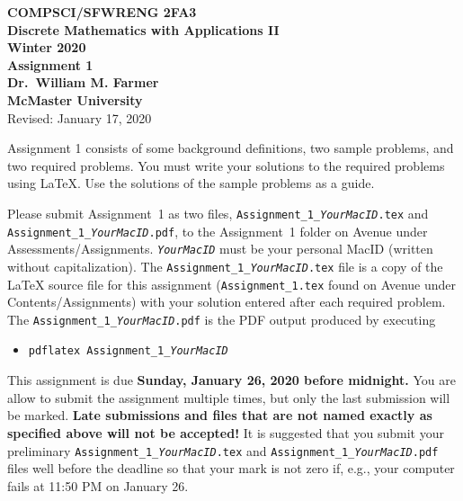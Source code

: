 \documentclass[11pt,fleqn]{article}
\begin{document}
\begin{center}

  {\large \textbf{COMPSCI/SFWRENG 2FA3}}\\[2mm]
  {\large \textbf{Discrete Mathematics with Applications II}}\\[2mm]
  {\large \textbf{Winter 2020}}\\[8mm]
  {\huge \textbf{Assignment 1}}\\[6mm]
  {\large \textbf{Dr.~William M. Farmer}}\\[2mm]
  {\large \textbf{McMaster University}}\\[6mm]
  {\large Revised: January 17, 2020}

\end{center}

\medskip

Assignment 1 consists of some background definitions, two sample
problems, and two required problems.  You must write your solutions to
the required problems using LaTeX.  Use the solutions of the sample
problems as a guide.

Please submit Assignment~1 as two files,
\texttt{Assignment\_1\_\emph{YourMacID}.tex} and
\texttt{Assignment\_1\_\emph{YourMacID}.pdf}, to the Assignment~1
folder on Avenue under Assessments/Assignments.
\texttt{\emph{YourMacID}} must be your personal MacID (written without
capitalization).  The \texttt{Assignment\_1\_\emph{YourMacID}.tex}
file is a copy of the LaTeX source file for this assignment
(\texttt{Assignment\_1.tex} found on Avenue under
Contents/Assignments) with your solution entered after each required
problem.  The \texttt{Assignment\_1\_\emph{YourMacID}.pdf} is the PDF
output produced by executing

\begin{itemize}

  \item[] \texttt{pdflatex Assignment\_1\_\emph{YourMacID}}

\end{itemize}

This assignment is due \textbf{Sunday, January 26, 2020 before
  midnight.}  You are allow to submit the assignment multiple times,
but only the last submission will be marked.  \textbf{Late submissions
  and files that are not named exactly as specified above will not be
  accepted!}  It is suggested that you submit your preliminary
\texttt{Assignment\_1\_\emph{YourMacID}.tex} and
\texttt{Assignment\_1\_\emph{YourMacID}.pdf} files well before the
deadline so that your mark is not zero if, e.g., your computer fails
at 11:50 PM on January 26.
\end{document}
